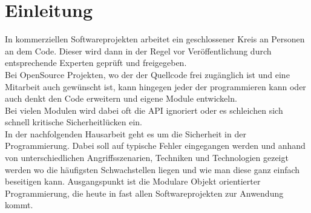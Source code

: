 \section{Einleitung}\label{einleitung}

In kommerziellen Softwareprojekten arbeitet ein geschlossener Kreis an
Personen an dem Code. Dieser wird dann in der Regel vor Veröffentlichung durch 
entsprechende Experten geprüft und freigegeben.
\\
Bei OpenSource Projekten, wo der der Quellcode frei zugänglich ist und eine Mitarbeit 
auch gewünscht ist, kann hingegen jeder der programmieren kann oder auch denkt den Code
erweitern und eigene Module entwickeln.
\\
Bei vielen Modulen wird dabei oft die API ignoriert oder es schleichen sich schnell 
kritische Sicherheitlücken ein.
\\
In der nachfolgenden Hausarbeit geht es um die Sicherheit in der Programmierung. 
Dabei soll auf typische Fehler eingegangen werden und anhand von unterschiedlichen 
Angriffsszenarien, Techniken und Technologien gezeigt werden wo die häufigsten 
Schwachstellen liegen und wie man diese ganz einfach beseitigen kann.
Ausgangspunkt ist die Modulare Objekt orientierter Programmierung, 
die heute in fast allen Softwareprojekten zur Anwendung kommt.\\
